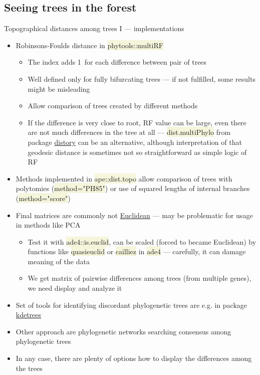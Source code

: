 \documentclass[compress, ucs, xelatex, 11pt, xcolor=svgnames, aspectratio=169,
	hyperref={
		bookmarks=true,
		unicode=true,
		colorlinks=true,
		pdftitle={Molecular data in R},
		plainpages=false,
		pdfauthor={Vojtech Zeisek},
		pdfsubject={Course about phylogeny and evolution in R},
		pdfcreator={XeLaTeX},
		pdfkeywords={R, evolution, phylogeny, molecular data},
		linkcolor=Crimson, %
		anchorcolor=Magenta, %
		citecolor=Magenta, %
		filecolor=Magenta, %
		menucolor=Magenta, %
		urlcolor=DodgerBlue, %
		pdftex},
	url={hyphens, lowtilde} %
	]{beamer}
\renewcommand{\texttt}[1]{\colorbox{Beige}{{\ttfamily #1}}}
\begin{document}
\subsection{Seeing trees in the forest}

\begin{frame}[allowframebreaks]{Topographical distances among trees I --- implementations}
	\begin{itemize}
		\item Robinsons-Foulds distance in \texttt{phytools::multiRF}
		\begin{itemize}
			\item The index adds 1~for each difference between pair of trees
			\item Well defined only for fully bifurcating trees --- if not fulfilled, some results might be misleading
			\item Allow comparison of trees created by different methods
			\item If the difference is very close to root, RF value can be large, even there are not much differences in the tree at all --- \texttt{dist.multiPhylo} from package \href{https://CRAN.R-project.org/package=distory}{distory} can be an alternative, although interpretation of that geodesic distance is sometimes not so straightforward as simple logic of RF
		\end{itemize}
		\item Methods implemented in \texttt{ape::dist.topo} allow comparison of trees with polytomies (\texttt{method="PH85"}) or use of squared lengths of internal branches (\texttt{method="score"})
		\item Final matrices are commonly not \href{https://en.wikipedia.org/wiki/Euclidean_distance_matrix}{Euclidean} --- may be problematic for usage in methods like PCA
		\begin{itemize}
			\item Test it with \texttt{ade4::is.euclid}, can be scaled (forced to became Euclidean) by functions like \texttt{quasieuclid} or \texttt{cailliez} in \texttt{ade4} --- carefully, it can damage meaning of the data
			\item We get matrix of pairwise differences among trees (from multiple genes), we need display and analyze it
		\end{itemize}
		\item Set of tools for identifying discordant phylogenetic trees are e.g. in package \href{https://CRAN.R-project.org/package=kdetrees}{kdetrees}
		\item Other approach are phylogenetic networks searching consensus among phylogenetic trees
		\item In any case, there are plenty of options how to display the differences among the trees
	\end{itemize}
\end{frame}
\end{document}
